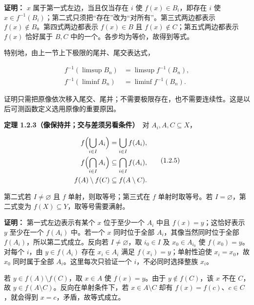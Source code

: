 \documentclass[11pt,a4paper]{article}
\begin{document}
\textbf{证明：} \(x\) 属于第一式左边，当且仅当存在 \(i\) 使
\(f(x)\in B_i\)，即存在 \(i\) 使
\(x\in f^{-1}(B_i)\)；第二式只须把``存在''改为``对所有''。第三式两边都表示
\(f(x)\notin B\)。第四式两边都表示 \(f(x)\in B\) 且
\(f(x)\notin C\)；第五式两边都表示 \(f(x)\) 恰好属于 \(B,C\)
中的一个。各步均为等价，故得到等式。

特别地，由上一节上下极限的尾并、尾交表达式，

\begin{equation*}
\begin{aligned}
f^{-1}(\limsup B_n)&=\limsup f^{-1}(B_n),\\
f^{-1}(\liminf B_n)&=\liminf f^{-1}(B_n).
\end{aligned}\tag{1.2.4}
\end{equation*}

证明只需把原像依次移入尾交、尾并；不需要极限存在，也不需要连续性。这是以后可测函数定义选用原像的重要原因。

\textbf{定理 1.2.3（像保持并；交与差须另看条件）}　对
\(A_i,A,C\subseteq X\)，

\begin{equation*}
\begin{aligned}
f\Bigl(\bigcup_{i\in I}A_i\Bigr)&=\bigcup_{i\in I}f(A_i),\\
f\Bigl(\bigcap_{i\in I}A_i\Bigr)&\subseteq\bigcap_{i\in I}f(A_i),\\
f(A)\setminus f(C)&\subseteq f(A\setminus C).
\end{aligned}\tag{1.2.5}
\end{equation*}

第二式若 \(I\ne\varnothing\) 且 \(f\) 单射，则取等号；第三式在 \(f\)
单射时取等号。若 \(I=\varnothing\)，第二式变为
\(f(X)\subseteq Y\)，取等号需要满射。

\textbf{证明：} 第一式左边表示有某个 \(x\) 位于至少一个 \(A_i\) 中且
\(f(x)=y\)；这恰好表示 \(y\) 至少在一个 \(f(A_i)\) 中。若一个 \(x\)
同时位于全部 \(A_i\)，其像当然同时位于全部
\(f(A_i)\)，所以第二式成立。反向若 \(I\ne\varnothing\)，取 \(i_0\in I\)
及 \(x_0\in A_{i_0}\) 使 \(f(x_0)=y\)。对每个 \(i\)，由 \(y\in f(A_i)\)
存在 \(x_i\in A_i\) 满足 \(f(x_i)=y\)；单射性迫使 \(x_i=x_0\)，故
\(x_0\) 同时属于全部 \(A_i\)。这里每次只验证一个 \(i\)，不必同时选择整族
\(x_i\)。

若 \(y\in f(A)\setminus f(C)\)，取 \(x\in A\) 使 \(f(x)=y\)。由于
\(y\notin f(C)\)，该 \(x\) 不在 \(C\)，故
\(y\in f(A\setminus C)\)。反向在单射条件下，若 \(x\in A\setminus C\)
却有 \(f(x)=f(c)\)、\(c\in C\)，就会得到 \(x=c\)，矛盾，故等式成立。
\end{document}
